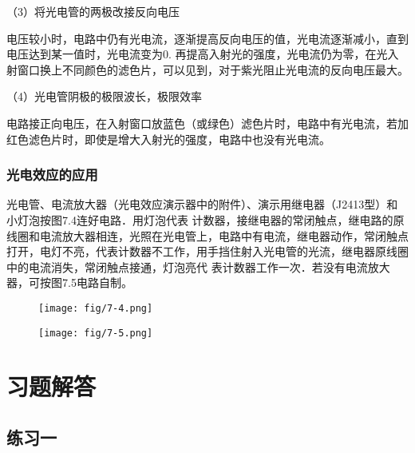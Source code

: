（3）将光电管的两极改接反向电压

电压较小时，电路中仍有光电流，逐渐提高反向电压的值，光电流逐渐减小，直到电压达到某一值时，光电流变为0. 再提高入射光的强度，光电流仍为零，在光入射窗口换上不同颜色的滤色片，可以见到，对于紫光阻止光电流的反向电压最大。

（4）光电管阴极的极限波长，极限效率

电路接正向电压，在入射窗口放蓝色（或绿色）滤色片时，电路中有光电流，若加红色滤色片时，即使是增大入射光的强度，电路中也没有光电流。

\subsubsection{光电效应的应用}

光电管、电流放大器（光电效应演示器中的附件）、演示用继电器（J2413型）和小灯泡按图7.4连好电路．用灯泡代表
计数器，接继电器的常闭触点，继电路的原线圈和电流放大器相连，光照在光电管上，电路中有电流，继电器动作，常闭触点打开，电灯不亮，代表计数器不工作，用手挡住射入光电管的光流，继电器原线圈中的电流消失，常闭触点接通，灯泡亮代
表计数器工作一次．若没有电流放大器，可按图7.5电路自制。

\begin{figure}[htp]\centering
    \begin{minipage}[t]{0.48\textwidth}
    \centering
    \texttt{[image: fig/7-4.png]}
    \caption{}
    \end{minipage}
    \begin{minipage}[t]{0.48\textwidth}
    \centering
    \texttt{[image: fig/7-5.png]}
    \caption{}
    \end{minipage}
    \end{figure}


\section{习题解答}


\subsection{练习一}

